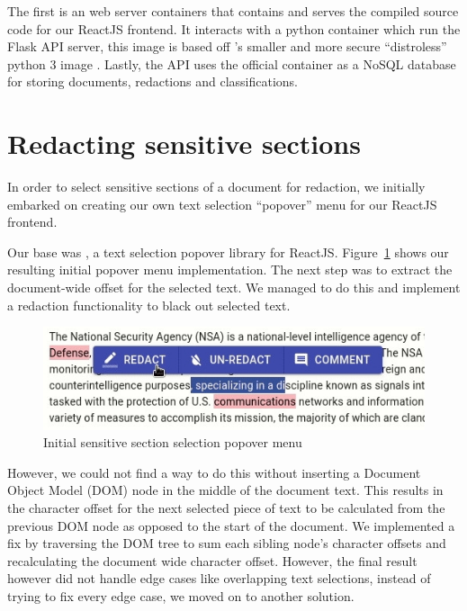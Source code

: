 \documentclass[\version]{l4proj}
\begin{document}
The first is an \textcite{NGINX2020} web server containers that contains and serves the compiled source code for our ReactJS frontend.
It interacts with a python container which run the Flask API server, this image is based off \textcite{GoogleContainerToolsDistroless2020}'s smaller and more secure ``distroless'' python 3 image \autocite{mooreDistrolessDockerContainerizing2017}.
Lastly, the API uses the official \textcite{MongoDB2020} container as a NoSQL database for storing documents, redactions and classifications.

\section{Redacting sensitive sections}



In order to select sensitive sections of a document for redaction, we initially embarked on creating our own text selection ``popover'' menu for our ReactJS frontend.

Our base was \textcite{krispel-samselJuliankrispelReacttextselectionpopover2020}, a text selection popover library for ReactJS.
Figure~\ref{fig:popover_1} shows our resulting initial popover menu implementation.
The next step was to extract the document-wide offset for the selected text.
We managed to do this and implement a redaction functionality to black out selected text.
\begin{figure}
    \includegraphics[width=\linewidth]{images/popover_menu_1.jpg}
    \caption{Initial sensitive section selection popover menu}\label{fig:popover_1}
    \vspace{-10pt}
\end{figure}
However, we could not find a way to do this without inserting a Document Object Model (DOM) node in the middle of the document text.
This results in the character offset for the next selected piece of text to be calculated from the previous DOM node as opposed to the start of the document.
We implemented a fix by traversing the DOM tree to sum each sibling node's character offsets and recalculating the document wide character offset.
However, the final result however did not handle edge cases like overlapping text selections, instead of trying to fix every edge case, we moved on to another solution.
\end{document}
